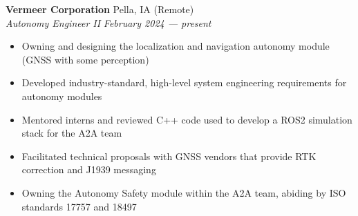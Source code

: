 \documentclass[a4paper]{article}
\begin{document}
\textbf{Vermeer Corporation} \hfill Pella, IA (Remote)\\
\textit{Autonomy Engineer II} \hfill \textit{February 2024 --- present}\\
\vspace{-1mm}
\begin{itemize}
    \item Owning and designing the localization and navigation autonomy module (GNSS with some perception)
    \item Developed industry-standard, high-level system engineering requirements for autonomy modules
    \item Mentored interns and reviewed C++ code used to develop a ROS2 simulation stack for the A2A team
    \item Facilitated technical proposals with GNSS vendors that provide RTK correction and J1939 messaging
    \item Owning the Autonomy Safety module within the A2A team, abiding by ISO standards 17757 and 18497
\end{itemize}
\end{document}
